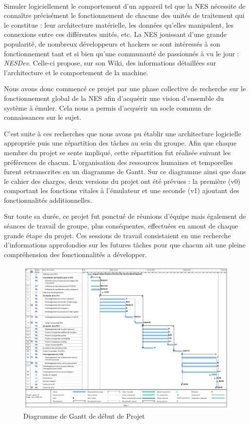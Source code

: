 \paragraph{}

Simuler logiciellement le comportement d'un appareil tel que la NES nécessite de connaître précisément le fonctionnement de chacune des unités de traitement qui le constitue : leur architecture matérielle, les données qu'elles manipulent, les connexions entre ces différentes unités, etc. La NES jouissant d'une grande popularité, de nombreux développeurs et hackers se sont intéressés à son fonctionnement tant et si bien qu'une communauté de passionnés à vu le jour : \emph{NESDev}. Celle-ci propose, sur son Wiki, des informations détaillées sur l'architecture et le comportement de la machine.

Nous avons donc commencé ce projet par une phase collective de recherche sur le fonctionnement global de la NES afin d'acquérir une vision d'ensemble du système à émuler. Cela nous a permis d'acquérir un socle commun de connaissances sur le sujet.

C'est suite à ces recherches que nous avons pu établir une architecture logicielle appropriée puis une répartition des tâches au sein du groupe. Afin que chaque membre du projet se sente impliqué, cette répartition fut réalisée suivant les préférences de chacun. L'organisation des ressources humaines et temporelles furent retranscrites en un diagramme de Gantt. Sur ce diagramme ainsi que dans le cahier des charges, deux versions du projet ont été prévues : la première (v0) comportant les fonctions vitales à l'émulateur et une seconde (v1) ajoutant des fonctionnalités additionnelles.

Sur toute sa durée, ce projet fut ponctué de réunions d'équipe mais également de séances de travail de groupe, plus conséquentes, effectuées en amont de chaque grande étape du projet. Ces sessions de travail consistaient en une recherche d'informations approfondies sur les futures tâches pour que chacun ait une pleine compréhension des fonctionnalités a développer.

\begin{figure}[h]
  \centering
   \includegraphics[scale=0.45]{GanttV1.png}
   \caption{\label{étiquette} Diagramme de Gantt de début de Projet}
\end{figure}
